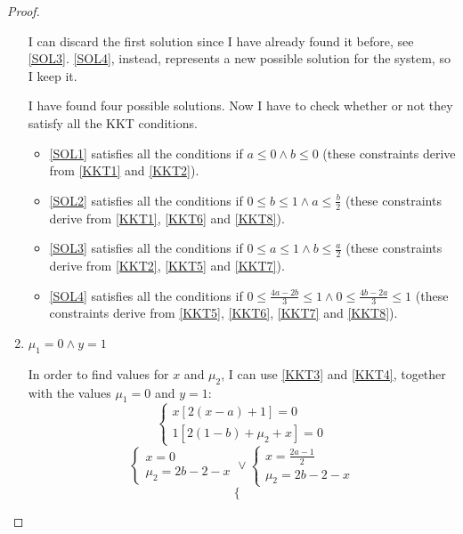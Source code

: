 \begin{proof}
\begin{enumerate}
            I can discard the first solution since I have already found it before, see \eqref{SOL3}. \eqref{SOL4}, instead, represents a new possible solution for the system, so I keep it.\par
            I have found four possible solutions. Now I have to check whether or not they satisfy all the KKT conditions.
            \begin{itemize}
                \item \eqref{SOL1} satisfies all the conditions if \(a \leq 0 \land b \leq 0\) (these constraints derive from \eqref{KKT1} and \eqref{KKT2}).
                \item \eqref{SOL2} satisfies all the conditions if \(0 \leq b \leq 1 \land a \leq \frac{b}{2}\) (these constraints derive from \eqref{KKT1}, \eqref{KKT6} and \eqref{KKT8}).
                \item \eqref{SOL3} satisfies all the conditions if \(0 \leq a \leq 1 \land b \leq \frac{a}{2}\) (these constraints derive from \eqref{KKT2}, \eqref{KKT5} and \eqref{KKT7}).
                \item \eqref{SOL4} satisfies all the conditions if \(0 \leq \frac{4a-2b}{3} \leq 1 \land 0 \leq \frac{4b-2a}{3} \leq 1\) (these constraints derive from \eqref{KKT5}, \eqref{KKT6}, \eqref{KKT7} and \eqref{KKT8}).
            \end{itemize}
        \item \(\mu_1 = 0 \land y = 1\)\par
            In order to find values for \(x\) and \(\mu_2\), I can use \eqref{KKT3} and \eqref{KKT4}, together with the values \(\mu_1 = 0\) and \(y = 1\):
            \[
                \begin{cases}
                    x[2(x-a) + 1] = 0 \\
                    1[2(1-b) + \mu_2 + x] = 0
                \end{cases}
            \]
            \[
                \begin{cases}
                    x = 0 \\
                    \mu_2 = 2b - 2 - x
                \end{cases}
                \lor
                \begin{cases}
                    x = \frac{2a-1}{2} \\
                    \mu_2 = 2b - 2 - x
                \end{cases}
            \]
            \[
                \begin{cases}

\end{cases}\]
\end{enumerate}
\end{proof}
